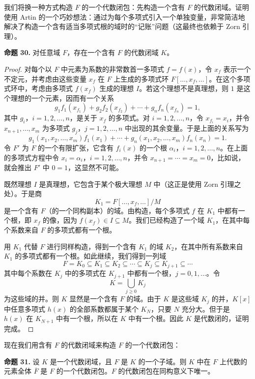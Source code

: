 我们将换一种方式构造 $F$ 的一个代数闭包：先构造一个含有 $F$ 的代数闭域。证明使用 Artin 的一个巧妙想法：通过为每个多项式引入一个单独变量，非常简洁地解决了构造一个含有适当多项式根的域时的“记账”问题（这最终也依赖于 Zorn 引理）。

\noindent\textbf{命题 30.} 对任意域 $F$，存在一个含有 $F$ 的代数闭域 $K$。


\begin{proof}
	对每个以 $F$ 中元素为系数的非常数首一多项式 $f=f(x)$，令 $x_f$ 表示一个不定元，并考虑由这些变量 $x_f$ 在 $F$ 上生成的多项式环 $F[\ldots,x_f,\ldots]$。在这个多项式环中，考虑由多项式 $f(x_f)$ 生成的理想 $I$。若这个理想不是真理想，则 $1$ 是这个理想的一个元素，因而有一个关系
	\[
	g_1 f_1(x_{f_1})+g_2 f_2(x_{f_2})+\cdots+g_n f_n(x_{f_n})=1,
	\]
	其中 $g_i$，$i=1,2,\ldots,n$，是关于 $x_f$ 的多项式。对 $i=1,2,\ldots,n$，令 $x_{f_i}=x_i$，并令 $x_{n+1},\ldots,x_m$ 为多项式 $g_j$，$j=1,2,\ldots,n$ 中出现的其余变量。于是上面的关系写为
	\[
	g_1(x_1,x_2,\ldots,x_m)f_1(x_1)+\cdots+g_n(x_1,x_2,\ldots,x_m)f_n(x_n)=1.
	\]
	令 $F'$ 为 $F$ 的一个有限扩张，它含有 $f_i(x)$ 的一个根 $\alpha_i$，$i=1,2,\ldots,n$。在上面的多项式方程中令 $x_i=\alpha_i$，$i=1,2,\ldots,n$，并令 $x_{n+1}=\cdots=x_m=0$，比如说，就会推出 $F'$ 中 $0=1$，这显然不可能。
	
	既然理想 $I$ 是真理想，它包含于某个极大理想 $M$ 中（这正是使用 Zorn 引理之处）。于是商
	\[
	K_1=F[\ldots,x_f,\ldots]/M
	\]
	是一个含有 $F$（的一个同构副本）的域。由构造，每个多项式 $f$ 在 $K_1$ 中都有一个根，即 $x_f$ 的像，因为 $f(x_f)\in I\subseteq M$。我们已经构造了一个域 $K_1$，在其中每个系数来自 $F$ 的多项式都有一个根。
	
	用 $K_1$ 代替 $F$ 进行同样构造，得到一个含有 $K_1$ 的域 $K_2$，在其中所有系数来自 $K_1$ 的多项式都有一个根。如此继续，我们得到一列域
	\[
	F=K_0\subseteq K_1\subseteq K_2\subseteq\cdots\subseteq K_j\subseteq K_{j+1}\subseteq\cdots
	\]
	其中每个系数在 $K_j$ 中的多项式在 $K_{j+1}$ 中都有一个根，$j=0,1,\ldots$。令
	\[
	K=\bigcup_{j\geq 0}K_j
	\]
	为这些域的并。则 $K$ 显然是一个含有 $F$ 的域。由于 $K$ 是这些域 $K_j$ 的并，$K[x]$ 中任意多项式 $h(x)$ 的全部系数都属于某个 $K_N$，只要 $N$ 充分大。但于是 $h(x)$ 在 $K_{N+1}$ 中有一个根，所以在 $K$ 中有一个根。因此 $K$ 是代数闭的，证明完成。
\end{proof}

现在我们用含有 $F$ 的代数闭域来构造 $F$ 的一个代数闭包：

\noindent\textbf{命题 31.} 设 $K$ 是一个代数闭域，且 $F$ 是 $K$ 的一个子域。则 $K$ 中在 $F$ 上代数的元素全体 $\overline F$ 是 $F$ 的一个代数闭包。$F$ 的代数闭包在同构意义下唯一。


